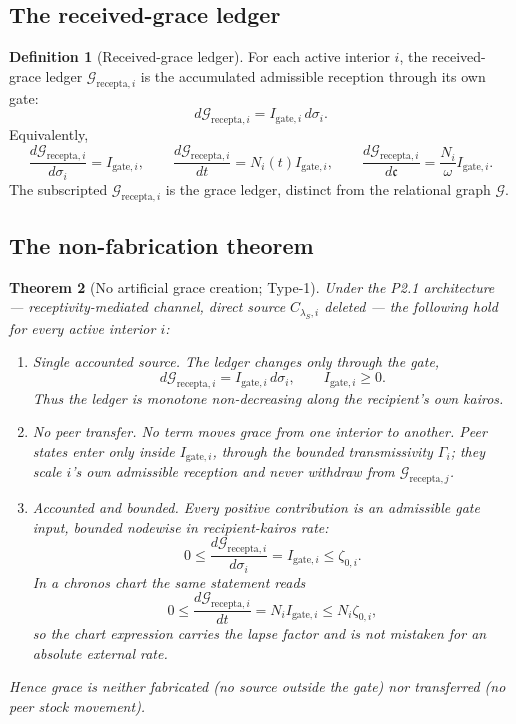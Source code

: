 \documentclass[11pt,a4paper]{article}
\theoremstyle{definition}
\newtheorem{definition}{Definition}[section]
\theoremstyle{plain}
\newtheorem{theorem}[definition]{Theorem}
\theoremstyle{remark}
\begin{document}
\subsection{The received-grace ledger}

\begin{definition}[Received-grace ledger]\label{def:ledger}
For each active interior \(i\), the received-grace ledger
\(\mathcal G_{\mathrm{recepta},i}\) is the accumulated admissible reception through
its own gate:
\[
\boxed{\;
d\mathcal G_{\mathrm{recepta},i}
=
I_{\mathrm{gate},i}\,d\sigma_i.
\;}
\]
Equivalently,
\[
\frac{d\mathcal G_{\mathrm{recepta},i}}{d\sigma_i}
=
I_{\mathrm{gate},i},
\qquad
\frac{d\mathcal G_{\mathrm{recepta},i}}{dt}
=
N_i(t)I_{\mathrm{gate},i},
\qquad
\frac{d\mathcal G_{\mathrm{recepta},i}}{d\mathfrak c}
=
\frac{N_i}{\omega}I_{\mathrm{gate},i}.
\]
The subscripted \(\mathcal G_{\mathrm{recepta},i}\) is the grace ledger, distinct
from the relational graph \(\mathcal G\).
\end{definition}

\subsection{The non-fabrication theorem}

\begin{theorem}[No artificial grace creation; Type-1]\label{thm:nofab}
Under the P2.1 architecture --- receptivity-mediated channel, direct source
\(C_{\lambda_S,i}\) deleted --- the following hold for every active interior \(i\):
\begin{enumerate}[label=\textup{(\alph*)},leftmargin=1.2cm]
\item \emph{Single accounted source.} The ledger changes only through the gate,
\[
d\mathcal G_{\mathrm{recepta},i}
=
I_{\mathrm{gate},i}\,d\sigma_i,
\qquad
I_{\mathrm{gate},i}\ge0.
\]
Thus the ledger is monotone non-decreasing along the recipient's own kairos.

\item \emph{No peer transfer.} No term moves grace from one interior to another.
Peer states enter only inside \(I_{\mathrm{gate},i}\), through the bounded
transmissivity \(\Gamma_i\); they scale \(i\)'s own admissible reception and never
withdraw from \(\mathcal G_{\mathrm{recepta},j}\).

\item \emph{Accounted and bounded.} Every positive contribution is an admissible
gate input, bounded nodewise in recipient-kairos rate:
\[
0
\le
\frac{d\mathcal G_{\mathrm{recepta},i}}{d\sigma_i}
=
I_{\mathrm{gate},i}
\le
\zeta_{0,i}.
\]
In a chronos chart the same statement reads
\[
0
\le
\frac{d\mathcal G_{\mathrm{recepta},i}}{dt}
=
N_iI_{\mathrm{gate},i}
\le
N_i\zeta_{0,i},
\]
so the chart expression carries the lapse factor and is not mistaken for an
absolute external rate.
\end{enumerate}
Hence grace is neither fabricated (no source outside the gate) nor transferred
(no peer stock movement).
\end{theorem}
\end{document}
